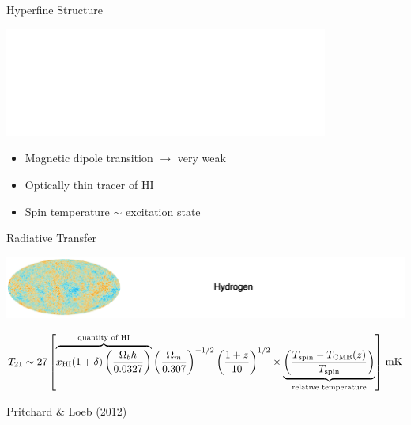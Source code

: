 \documentclass{beamer}
\begin{document}
\begin{frame}{Hyperfine Structure}
    \begin{center}
        \includegraphics[width=0.8\textwidth]{figures/finestructure}
    \end{center}
    \begin{itemize}[label=\textbullet, leftmargin=5em]
        \item Magnetic dipole transition $\rightarrow$ very weak
        \item Optically thin tracer of HI
        \item Spin temperature $\sim$ excitation state
    \end{itemize}
\end{frame}

\begin{frame}{Radiative Transfer}
    \begin{center}
        \includegraphics[width=\textwidth]{figures/radiative-transfer}
    \end{center}
    \begin{dmath*}
        T_{21} \sim 27 \left[
            \overbrace{
                x_{\rm HI} (1+\delta)
                \left(\frac{\Omega_b h}{0.0327}\right)
            }^{\text{quantity of HI}}
            \left(\frac{\Omega_m}{0.307}\right)^{-1/2}
            \left(\frac{1+z}{10}\right)^{1/2} \linebreak \times
            \underbrace{
                \left(\frac{T_{\rm spin} - T_{\rm CMB}(z)}{T_{\rm spin}}\right)
            }_{\text{relative temperature}}
        \right] \, {\rm mK}
    \end{dmath*}
    \begin{center}
        \tiny{Pritchard \& Loeb (2012)}
    \end{center}
\end{frame}
\end{document}
